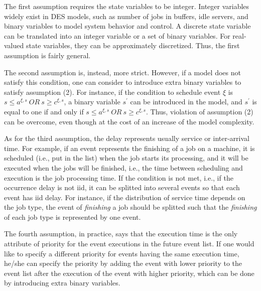 \documentclass[]{interact}
\theoremstyle{plain}%
\theoremstyle{definition}
\theoremstyle{remark}
\begin{document}
The first assumption requires the state variables to be integer. Integer variables widely exist in DES models, such as number of jobs in buffers, idle servers, and binary variables to model system behavior and control. A discrete state variable can be translated into an integer variable or a set of binary variables. For real-valued state variables, they can be approximately discretized. Thus, the first assumption is fairly general.

The second assumption is, instead, more strict. However, if a model does not satisfy this condition, one can consider to introduce extra binary variables to satisfy assumption (2). For instance, if the condition to schedule event ${\xi}$ is $s\le a^{\xi,s} \ OR\ s\ge c^{\xi,s}$, a binary variable $s^{'}$ can be introduced in the model, and $s^{'}$ is equal to one if and only if 
$s\le a^{\xi,s} \ OR\ s\ge c^{\xi,s}$. Thus, violation of assumption (2) can be overcome, even though at the cost of an increase of the model complexity.

As for the third assumption, the delay represents usually service or inter-arrival time. For example, if an event represents the finishing of a job on a machine, it is scheduled (i.e., put in the list) when the job starts its processing, and it will be executed when the jobs will be finished, i.e., the time between scheduling and execution is the job processing time. 
If the condition is not met, i.e., if the occurrence delay is not iid, it can be splitted into several events so that each event has iid delay. For instance, if the distribution of service time depends on the job type, the event of \textit{finishing} a job should be splitted such that the \textit{finishing} of each job type is represented by one event. 
 
The fourth assumption, in practice, says that the execution time is the only attribute of priority for the event executions in the future event list. If one would like to specify a different priority for events having the same execution time, he/she can specify the priority by adding the event with lower priority to the event list after the execution of the event with higher priority, which can be done by introducing extra binary variables. 
\end{document}
